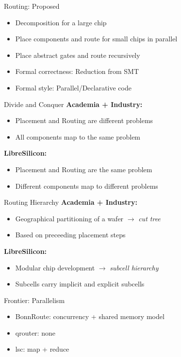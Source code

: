 \documentclass[aspectratio=169]{beamer}
\begin{document}
\begin{frame}{Routing: Proposed}
	\begin{itemize}
        \setlength\itemsep{1em}
		\item Decomposition for a large chip
		\item Place components and route for small chips in parallel
		\item Place abstract gates and route recursively
		\item Formal correctness: Reduction from SMT
		\item Formal style: Parallel/Declarative code
	\end{itemize}
\end{frame}

\begin{frame}{Divide and Conquer}
	    \textbf{Academia + Industry:}
	    \begin{itemize}
		\item Placement and Routing are different problems
		\item All components map to the same problem
	    \end{itemize}
	    \textbf{LibreSilicon:}
	    \begin{itemize}
		\item Placement and Routing are the same problem
		\item Different components map to different problems
	    \end{itemize}
\end{frame}

\begin{frame}{Routing Hierarchy}
	    \textbf{Academia + Industry:}
	    \begin{itemize}
		\item Geographical partitioning of a wafer $\rightarrow$ \textit{cut tree}
		\item Based on preceeding placement steps
	    \end{itemize}
	    \textbf{LibreSilicon:}
	    \begin{itemize}
		\item Modular chip development $\rightarrow$ \textit{subcell hierarchy}
		\item Subcells carry implicit and explicit subcells
	    \end{itemize}
\end{frame}

\begin{frame}{Frontier: Parallelism}
	\begin{itemize}
        \setlength\itemsep{1em}
		\item BonnRoute: concurrency + shared memory model
		\item qrouter: none 
		\item lsc: map + reduce
	\end{itemize}
\end{frame}
\end{document}
